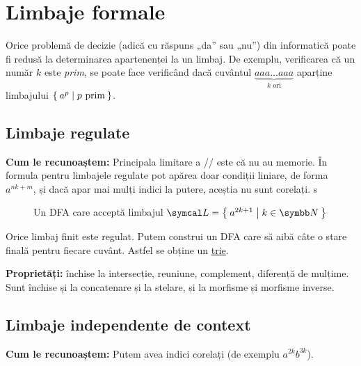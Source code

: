 \section*{Limbaje formale}

Orice problemă de decizie (adică cu răspuns „da” sau „nu”) din informatică poate fi redusă la determinarea apartenenței la un limbaj.
De exemplu, verificarea că un număr \(k\) este \emph{prim}, se poate face verificând dacă cuvântul \(\underbrace{aaa \dots aaa}_{k \text{ ori}}\) aparține limbajului \(\Set{ a^p | p \text{ prim} }\).

\subsection*{Limbaje regulate}

\textbf{Cum le recunoaștem:} Principala limitare a \dfa/\nfa/\lnfa{} este că nu au memorie. În formula pentru limbajele regulate pot apărea doar condiții liniare, de forma \(a^{nk + m}\), și dacă apar mai mulți indici la putere, aceștia nu sunt corelați.
s
\begin{figure}[H]
    \centering
    \caption*{Un DFA care acceptă limbajul \(\limbaj = \Set{a^{2k + 1} | k \in \naturals}\)}
\end{figure}

\begin{observation}
    Orice limbaj finit este regulat. Putem construi un DFA care să aibă câte o stare finală pentru fiecare cuvânt. Astfel se obține un \href{https://en.wikipedia.org/wiki/Trie}{trie}.
\end{observation}

\textbf{Proprietăți:} închise la intersecție, reuniune, complement, diferență de mulțime. Sunt închise și la concatenare și la stelare, și la morfisme și morfisme inverse.

\subsection*{Limbaje independente de context}

\textbf{Cum le recunoaștem:} Putem avea indici corelați (de exemplu \(a^{2k} b^{3k}\)).


